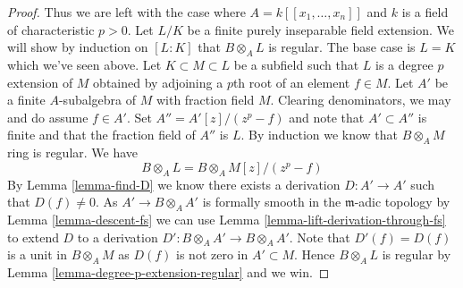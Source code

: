 \begin{proof}
\medskip\noindent
Thus we are left with the case where $A = k[[x_1, \ldots, x_n]]$
and $k$ is a field of characteristic $p > 0$.
Let $L/K$ be a finite purely inseparable field extension.
We will show by induction on $[L : K]$ that $B \otimes_A L$
is regular. The base case is $L = K$ which we've seen above.
Let $K \subset M \subset L$ be a subfield such that
$L$ is a degree $p$ extension of $M$ obtained by adjoining a $p$th root
of an element $f \in M$. Let $A'$ be a finite $A$-subalgebra
of $M$ with fraction field $M$. Clearing denominators, we may and do assume
$f \in A'$. Set $A'' = A'[z]/(z^p -f)$ and note that $A' \subset A''$
is finite and that the fraction field of $A''$ is $L$.
By induction we know that $B \otimes_A M$ ring is regular.
We have
$$
B \otimes_A L = B \otimes_A M[z]/(z^p - f)
$$
By Lemma \ref{lemma-find-D} we know there exists a derivation
$D : A' \to A'$ such that $D(f) \not = 0$. As $A' \to B \otimes_A A'$
is formally smooth in the $\mathfrak m$-adic topology by
Lemma \ref{lemma-descent-fs}
we can use
Lemma \ref{lemma-lift-derivation-through-fs}
to extend $D$ to a derivation $D' : B \otimes_A A' \to B \otimes_A A'$.
Note that $D'(f) = D(f)$ is a unit in $B \otimes_A M$ as $D(f)$
is not zero in $A' \subset M$. Hence $B \otimes_A L$ is regular by
Lemma \ref{lemma-degree-p-extension-regular} and we win.
\end{proof}